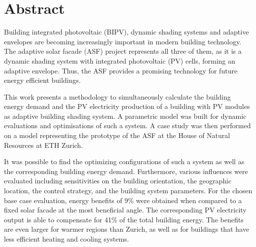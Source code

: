 \chapter*{Abstract}
Building integrated photovoltaic (BIPV), dynamic shading systems and adaptive envelopes are becoming increasingly important in modern building technology. The adaptive solar facade (ASF) project represents all three of them, as it is a dynamic shading system with integrated photovoltaic (PV) cells, forming an adaptive envelope. Thus, the ASF provides a promising technology for future energy efficient buildings. 

This work presents a methodology to simultaneously calculate the building energy demand and the PV electricity production of a building with PV modules as adaptive building shading system. A parametric model was built for dynamic evaluations and optimisations of such a system. A case study was then performed on a model representing the prototype of the ASF at the House of Natural Resources at ETH Zurich. 

It was possible to find the optimizing configurations of such a system as well as the corresponding building energy demand. Furthermore, various influences were evaluated including sensitivities on the building orientation, the geographic location, the control strategy, and the building system parameters. For the chosen base case evaluation, energy benefits of 9\% were obtained when compared to a fixed solar facade at the most beneficial angle. The corresponding PV electricity output is able to compensate for 41\% of the total building energy. The benefits are even larger for warmer regions than Zurich, as well as for buildings that have less efficient heating and cooling systems. 
\newpage